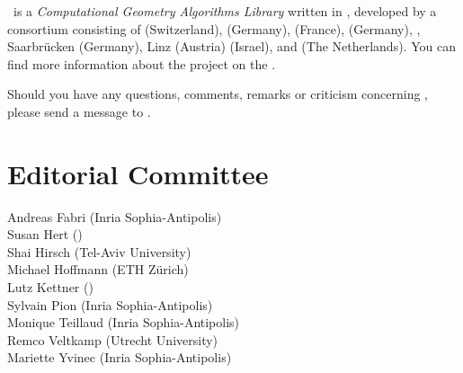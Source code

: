 

\cgal\ is a {\em Computational Geometry Algorithms Library} written in \CC, 
developed by a consortium consisting of
 (Switzerland), 
 (Germany), 
 (France),
 (Germany),
,
Saarbr\"ucken (Germany),
 Linz (Austria)
 (Israel), and
 (The Netherlands). 
You can find more information about the project on the 
.

Should you have any questions, comments, remarks or criticism concerning 
\cgal, please send a message to 
.


\section*{Editorial Committee}

Andreas Fabri ({\sc Inria} Sophia-Antipolis) \\
Susan Hert ()\\
Shai Hirsch (Tel-Aviv University) \\
Michael Hoffmann (ETH Z\"urich) \\
Lutz Kettner ()\\ 
Sylvain Pion ({\sc Inria} Sophia-Antipolis)\\
Monique Teillaud ({\sc Inria} Sophia-Antipolis)\\
Remco Veltkamp (Utrecht University)\\
Mariette Yvinec ({\sc Inria} Sophia-Antipolis)\\




